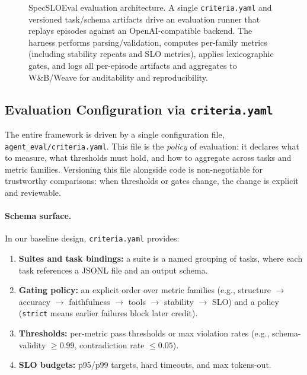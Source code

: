 \documentclass[11pt]{article}
\begin{document}
\begin{figure}[t]
\caption{SpecSLOEval evaluation architecture.
A single \texttt{criteria.yaml} and versioned task/schema artifacts drive an evaluation runner that replays episodes against an OpenAI-compatible backend.
The harness performs parsing/validation, computes per-family metrics (including stability repeats and SLO metrics), applies lexicographic gates, and logs all per-episode artifacts and aggregates to W\&B/Weave for auditability and reproducibility.}
\label{fig:eval-arch}
\end{figure}

\subsection{Evaluation Configuration via \texttt{criteria.yaml}}
\label{sec:criteria-yaml}

The entire framework is driven by a single configuration file, \texttt{agent\_eval/criteria.yaml}.
This file is the \emph{policy} of evaluation: it declares what to measure, what thresholds must hold, and how to aggregate across tasks and metric families.
Versioning this file alongside code is non-negotiable for trustworthy comparisons: when thresholds or gates change, the change is explicit and reviewable.

\paragraph{Schema surface.}
In our baseline design, \texttt{criteria.yaml} provides:

\begin{enumerate}[leftmargin=12pt]
    \item \textbf{Suites and task bindings:} a suite is a named grouping of tasks, where each task references a JSONL file and an output schema.
    \item \textbf{Gating policy:} an explicit order over metric families (e.g., structure $\rightarrow$ accuracy $\rightarrow$ faithfulness $\rightarrow$ tools $\rightarrow$ stability $\rightarrow$ SLO) and a policy (\texttt{strict} means earlier failures block later credit).
    \item \textbf{Thresholds:} per-metric pass thresholds or max violation rates (e.g., schema-validity $\ge 0.99$, contradiction rate $\le 0.05$).
    \item \textbf{SLO budgets:} p95/p99 targets, hard timeouts, and max tokens-out.
\end{enumerate}
\end{document}
